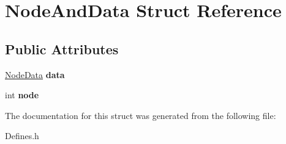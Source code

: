 \hypertarget{structNodeAndData}{
\section{NodeAndData Struct Reference}
\label{structNodeAndData}
}
\subsection*{Public Attributes}
\begin{DoxyCompactItemize}
\item 
\hypertarget{structNodeAndData_aac0364aa0f250fc253a70713849c2085}{
\hyperlink{structNodeData}{NodeData} {\bfseries data}}
\label{structNodeAndData_aac0364aa0f250fc253a70713849c2085}

\item 
\hypertarget{structNodeAndData_acad67c8ca3ed7bf54964702746341797}{
int {\bfseries node}}
\label{structNodeAndData_acad67c8ca3ed7bf54964702746341797}

\end{DoxyCompactItemize}


The documentation for this struct was generated from the following file:\begin{DoxyCompactItemize}
\item 
Defines.h\end{DoxyCompactItemize}
